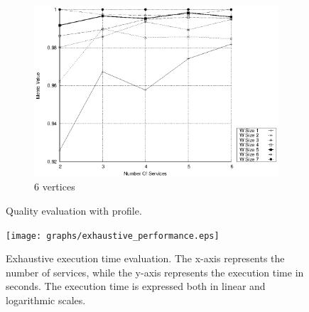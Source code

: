 \begin{figure}[h]
\begin{subfigure}{0.33\textwidth}
    \includegraphics[width=\textwidth]{Images/graphs/window_quality_performance_diff_qual_n7_s7_50_80_n7}
    \caption{6 vertices}
    \label{fig:quality_window_average_qualitative_n7}
  \end{subfigure}

  \caption{ Quality evaluation with \wide profile.}
  \label{fig:quality_window_average_qualitative}
\end{figure}

\begin{figure}
  \texttt{[image: graphs/exhaustive\_performance.eps]}
  \caption{Exhaustive execution time evaluation. The x-axis represents the number of services, while the y-axis represents the execution time in seconds. The execution time is expressed both in linear and logarithmic scales.}
  \label{fig:perf_exhaustive}
\end{figure}

